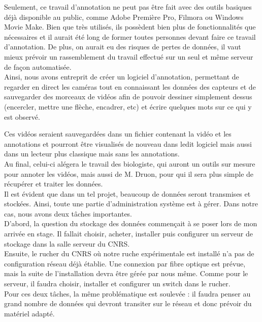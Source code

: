 \documentclass[11pt,french,a4paper]{report}
\begin{document}
Seulement, ce travail d'annotation ne peut pas être fait avec des outils basiques déjà disponible au public, comme Adobe Première Pro, 
Filmora ou Windows Movie Make. Bien que très utilisés, ils possèdent bien plus de fonctionnalités que nécessaires et il aurait été long
de former toutes personnes devant faire ce travail d'annotation. De plus, on aurait eu des risques de pertes de données, il vaut mieux
prévoir un rassemblement du travail effectué sur un seul et même serveur de façon automatisée. \\

Ainsi, nous avons entreprit de créer un logiciel d'annotation, permettant de regarder en direct les caméras tout en connaissant
les données des capteurs et de sauvegarder des morceaux de vidéos afin de pouvoir dessiner simplement dessus 
(encercler, mettre une flèche, encadrer, etc) et écrire quelques mots sur ce qui y est observé.

Ces vidéos seraient sauvegardées dans un fichier contenant la vidéo et les annotations et pourront être 
visualisés de nouveau dans ledit logiciel mais aussi dans un lecteur plus classique mais sans les annotations. \\
Au final, celui-ci alégera le travail des biologiste, qui auront un outils sur mesure pour annoter les vidéos, mais aussi de M. Druon, 
pour qui il sera plus simple de récupérer et traiter les données.\\


Il est évident que dans un tel projet, beaucoup de données seront transmises et stockées. Ainsi, toute une partie d'administration 
système est à gérer. Dans notre cas, nous avons deux tâches importantes.\\

D'abord, la question du stockage des données commençait à se poser lors de mon arrivée en stage. Il fallait choisir, acheter, installer
puis configurer un serveur de stockage dans la salle serveur du CNRS.\\
Ensuite, le rucher du CNRS où notre ruche expérimentale est installé n'a pas de configuration réseau déjà établie. 
Une connexion par fibre optique est prévue, mais la suite de l'installation devra être gérée par nous même. Comme pour le serveur, 
il faudra choisir, installer et configurer un switch dans le rucher.\\

Pour ces deux tâches, la même problématique est soulevée : il faudra penser au grand nombre de données qui devront transiter sur le 
réseau et donc prévoir du matériel adapté.\\
\end{document}
